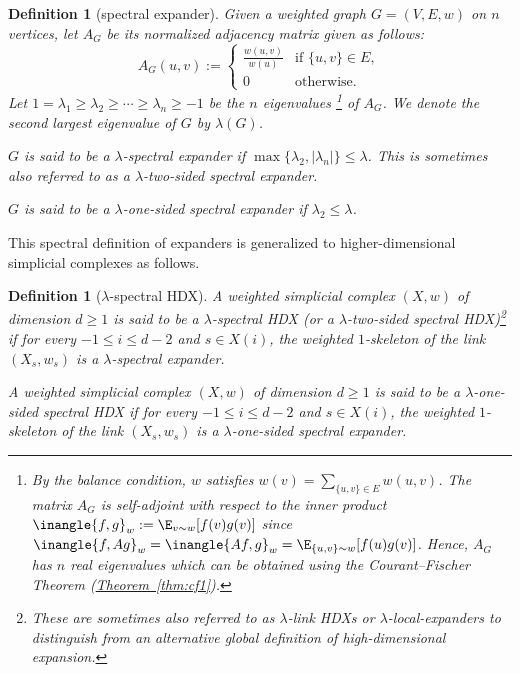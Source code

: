 \documentclass[11pt]{article}
\newcommand{\expref}[2]{\texorpdfstring{\hyperref[#2]{#1~\ref{#2}}}{#1~\ref{#2}}}
\newtheorem{definition}[theorem]{Definition}
\begin{document}
\begin{definition}[spectral expander]  \label{def:spectral-expander}
Given %
a %
weighted graph $G=(V,E, w)$ on $n$ vertices, let $A_G$ be its
normalized adjacency matrix given as follows:
\[ A_G(u,v) := \begin{cases}
        \frac{w(u,v)}{w(u)} & \text{if } \{u,v\} \in E,\\
      0 & \text{otherwise.}
    \end{cases}
    \]
Let $1 = \lambda_1 \geq \lambda_2 \geq
\cdots \geq \lambda_n \geq -1$ be the $n$ eigenvalues%
%
%
%
%
%
%
%
%
\footnote{By the balance condition, $w$ satisfies
  $w(v) = \sum_{\{u,v\} \in E} w(u,v)$. The
  matrix $A_G$ is self-adjoint with respect to the
  inner product $\inangle{f,g}_w := \E_{v \sim w}[f(v) g(v)]$ since
  $\inangle{f,Ag}_w = \inangle{Af,g}_w = \E_{\{u,v\} \sim w}[f(u)
  g(v)]$. Hence, $A_G$ has $n$ real eigenvalues which can be
  obtained using the %
  Courant--Fischer Theorem (\expref{Theorem}{thm:cf1}).}
 of $A_G$.  We denote the second largest
eigenvalue of $G$ %
by  %
$\lambda(G)$. 

$G$ is said to be a
\emph{$\lambda$-spectral expander} if $\max\{\lambda_2,|\lambda_n|\}
\leq \lambda$. This is sometimes also referred to as a
$\lambda$-two-sided spectral expander.

$G$ is said to be a
\emph{$\lambda$-one-sided spectral expander}
if $\lambda_2 \leq \lambda$.
\end{definition}

This spectral definition of expanders is generalized to
higher-dimensional  %
simplicial complexes as follows.

\begin{definition}[$\lambda$-spectral HDX]\label{def:hdx}
  A weighted simplicial complex $(X,w)$ of dimension $d \geq 1$ is said to be a
  \emph{$\lambda$-spectral HDX} (or a
\emph{$\lambda$-two-sided spectral HDX})\footnote{These 
     are sometimes also referred
    to as $\lambda$-link HDXs or $\lambda$-local-expanders to
    distinguish from an alternative global definition of
    high-dimensional expansion.} if for every $-1\leq i \leq d-2$ and
  $s \in X(i)$, the weighted $1$-skeleton of the link $(X_s, w_s)$ is a
  $\lambda$-spectral expander.

A weighted simplicial complex $(X,w)$ of dimension $d \geq 1$ is said to be a
 \emph{$\lambda$-one-sided spectral HDX}
if for every $-1\leq i \leq d-2$ and
  $s \in X(i)$, the weighted $1$-skeleton of the link $(X_s,w_s)$ is a
  $\lambda$-one-sided spectral expander.
\end{definition}
\end{document}
